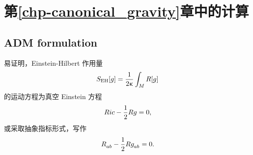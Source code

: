 
\chapter{第\ref{chp-canonical_gravity}章中的计算}

	\section{ADM formulation}

		\begin{Property}
			\label{pro_EEq}
			易证明，Einstein-Hilbert 作用量
			\begin{equation}
				S_{\text{EH}}[g] = \frac{1}{2\upkappa} \int_M {R}[g] 
			\end{equation}
			的运动方程为真空 Einstein 方程
			\begin{equation}
				Ric - \frac{1}{2} {R} g = 0,
			\end{equation}
			或采取抽象指标形式，写作
			\begin{equation}
				\tensor{\Ric}{_a_b} - \frac{1}{2} \curR \tensor{g}{_a_b} = 0.
			\end{equation}
		\end{Property}

